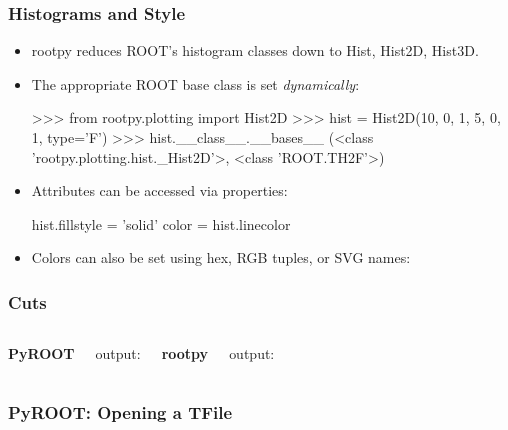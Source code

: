 \documentclass[10pt,professionalfonts,serif,usenames,dvipsnames,svgnames,table]{beamer}
\begin{document}
\begin{frame}[fragile]
    \frametitle{Histograms and Style}
    \begin{itemize}
        \item rootpy reduces ROOT's histogram classes down to Hist, Hist2D,
            Hist3D.
        \item The appropriate ROOT base class is set {\em dynamically}:
            \begin{footnotesize}
\begin{pyglist}[language=python,texcl=true,style=vs]
>>> from rootpy.plotting import Hist2D
>>> hist = Hist2D(10, 0, 1, 5, 0, 1, type='F')
>>> hist.__class__.__bases__
(<class 'rootpy.plotting.hist._Hist2D'>, <class 'ROOT.TH2F'>)
\end{pyglist}
\end{footnotesize}
\item Attributes can be accessed via properties:
\begin{pyglist}[language=python,texcl=true,style=vs]
      hist.fillstyle = 'solid'
      color = hist.linecolor
\end{pyglist}
\item Colors can also be set using hex, RGB tuples, or SVG names:
\end{itemize}
\end{frame}

\begin{frame}[fragile]
    \frametitle{Cuts}
    \begin{columns}
        {\bf PyROOT}
        
        output:
        
        {\bf rootpy}
        
        output:
        
    \end{columns}
\end{frame}

\begin{frame}[fragile]
    \frametitle{PyROOT: Opening a TFile}

    
    \vspace{-.5cm}
    
\end{frame}
\end{document}
